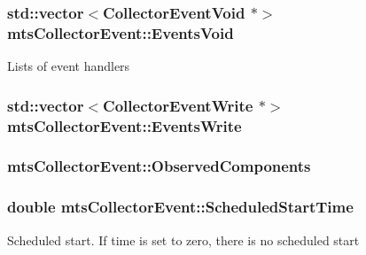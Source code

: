 \subsubsection[{Events\+Void}]{\setlength{\rightskip}{0pt plus 5cm}std\+::vector$<${\bf Collector\+Event\+Void} $\ast$$>$ mts\+Collector\+Event\+::\+Events\+Void\hspace{0.3cm}{\ttfamily [protected]}}\label{classmts_collector_event_a5c71a9d9e4ebcd24d5b72c096aa48615}
Lists of event handlers \hypertarget{classmts_collector_event_a6924ca78e61980e8079b5957e7648ad7}{}
\subsubsection[{Events\+Write}]{\setlength{\rightskip}{0pt plus 5cm}std\+::vector$<${\bf Collector\+Event\+Write} $\ast$$>$ mts\+Collector\+Event\+::\+Events\+Write\hspace{0.3cm}{\ttfamily [protected]}}\label{classmts_collector_event_a6924ca78e61980e8079b5957e7648ad7}
\hypertarget{classmts_collector_event_a0f4a7cc03d7c29dc4b853fc248415578}{}
\subsubsection[{Observed\+Components}]{ mts\+Collector\+Event\+::\+Observed\+Components\hspace{0.3cm}{\ttfamily [protected]}}\label{classmts_collector_event_a0f4a7cc03d7c29dc4b853fc248415578}
\hypertarget{classmts_collector_event_a16f82074f7e622b72a100c8c99c1354e}{}
\subsubsection[{Scheduled\+Start\+Time}]{\setlength{\rightskip}{0pt plus 5cm}double mts\+Collector\+Event\+::\+Scheduled\+Start\+Time\hspace{0.3cm}{\ttfamily [protected]}}\label{classmts_collector_event_a16f82074f7e622b72a100c8c99c1354e}
Scheduled start. If time is set to zero, there is no scheduled start \hypertarget{classmts_collector_event_ad7213ee6804878731b6d0d7effa3dd0a}{}
